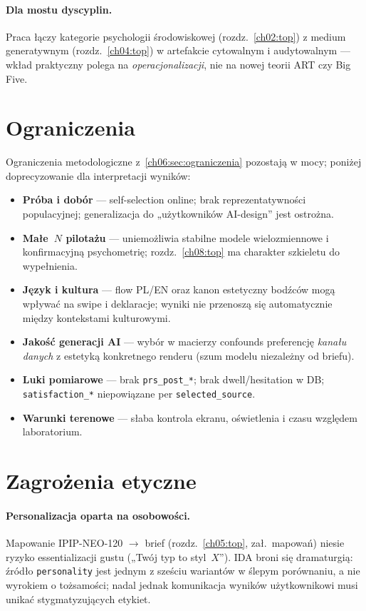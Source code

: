 \paragraph{Dla mostu dyscyplin.}
Praca łączy kategorie psychologii środowiskowej (rozdz.~\ref{ch02:top}) z medium generatywnym (rozdz.~\ref{ch04:top}) w artefakcie cytowalnym i audytowalnym \parencite{idaPlatform2026} --- wkład praktyczny polega na \emph{operacjonalizacji}, nie na nowej teorii ART czy Big Five.

\section{Ograniczenia}
\label{ch09:sec:ograniczenia}

Ograniczenia metodologiczne z~\cref{ch06:sec:ograniczenia} pozostają w mocy; poniżej doprecyzowanie dla interpretacji wyników:

\begin{itemize}
  \item \textbf{Próba i dobór} --- self-selection online; brak reprezentatywności populacyjnej; generalizacja do „użytkowników AI-design” jest ostrożna.
  \item \textbf{Małe~$N$ pilotażu} --- uniemożliwia stabilne modele wielozmiennowe i konfirmacyjną psychometrię; rozdz.~\ref{ch08:top} ma charakter szkieletu do wypełnienia.
  \item \textbf{Język i kultura} --- flow PL/EN oraz kanon estetyczny bodźców mogą wpływać na swipe i deklaracje; wyniki nie przenoszą się automatycznie między kontekstami kulturowymi.
  \item \textbf{Jakość generacji AI} --- wybór w macierzy confounds preferencję \emph{kanału danych} z estetyką konkretnego renderu (szum modelu niezależny od briefu).
  \item \textbf{Luki pomiarowe} --- brak \texttt{prs\_post\_*}; brak dwell/hesitation w DB; \texttt{satisfaction\_*} niepowiązane per \texttt{selected\_source}.
  \item \textbf{Warunki terenowe} --- słaba kontrola ekranu, oświetlenia i czasu względem laboratorium.
\end{itemize}

\section{Zagrożenia etyczne}
\label{ch09:sec:etyka}

\paragraph{Personalizacja oparta na osobowości.}
Mapowanie IPIP-NEO-120 $\rightarrow$ brief (rozdz.~\ref{ch05:top}, zał.\ mapowań) niesie ryzyko essentializacji gustu („Twój typ to styl~$X$”).
IDA broni się dramaturgią: źródło \texttt{personality} jest jednym z sześciu wariantów w ślepym porównaniu, a nie wyrokiem o tożsamości; nadal jednak komunikacja wyników użytkownikowi musi unikać stygmatyzujących etykiet.

